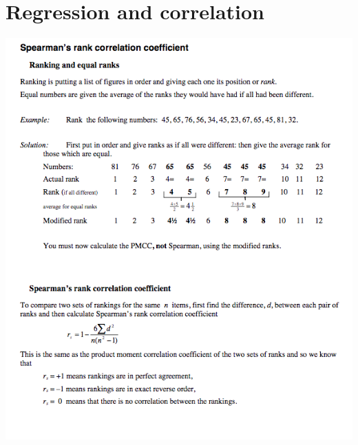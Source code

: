 \documentclass[a4paper]{article}
\begin{document}
\section{Regression and correlation}
\begin{center}
	\includegraphics[scale=0.5]{img_S/20_eg1}
\end{center}
\end{document}
